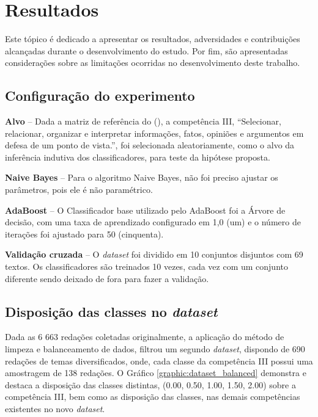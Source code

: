 \section{Resultados}

Este tópico é dedicado a apresentar os resultados, adversidades e contribuições 
alcançadas durante o desenvolvimento do estudo. Por fim, são apresentadas 
considerações sobre as limitações ocorridas no desenvolvimento deste trabalho.

\subsection{Configuração do experimento}
\label{subsection:configuracao}

\textbf{Alvo} -- Dada a matriz de referência do \citeauthor{edital_enem:2016} 
(\citeyear{edital_enem:2016}), a competência III, ``Selecionar, relacionar, 
organizar e interpretar informações, fatos, opiniões e argumentos em defesa de 
um ponto de vista.'', foi selecionada aleatoriamente, como o alvo da 
inferência indutiva dos classificadores, para teste da hipótese proposta.

\textbf{Naive Bayes} -- Para o algoritmo Naive Bayes, não foi preciso ajustar os
parâmetros, pois ele é não paramétrico.

\textbf{AdaBoost} -- O Classificador base utilizado pelo AdaBoost foi a
Árvore de decisão, com uma taxa de aprendizado configurado em 1,0 (um) e o 
número de iterações foi ajustado para 50 (cinquenta).

\textbf{Validação cruzada} -- O \textit{dataset} foi dividido em 10 conjuntos 
disjuntos com 69 textos. Os classificadores são treinados 10 vezes, cada 
vez com um conjunto diferente sendo deixado de fora para fazer a validação.

\subsection{Disposição das classes no \textit{dataset}}
\label{subsection:balanceamento}

Dada as 6 663 redações coletadas originalmente, a aplicação do método de 
limpeza e balanceamento de dados, filtrou um segundo \textit{dataset}, dispondo 
de 690 redações de temas diversificados, onde, cada classe da competência III 
possui uma amostragem de 138 redações. O Gráfico \ref{graphic:dataset_balanced} 
demonstra e destaca a disposição das classes distintas, (0.00, 0.50, 1.00, 
1.50, 2.00) sobre a competência III, bem como as disposição das classes, nas 
demais competências existentes no novo \textit{dataset}.

